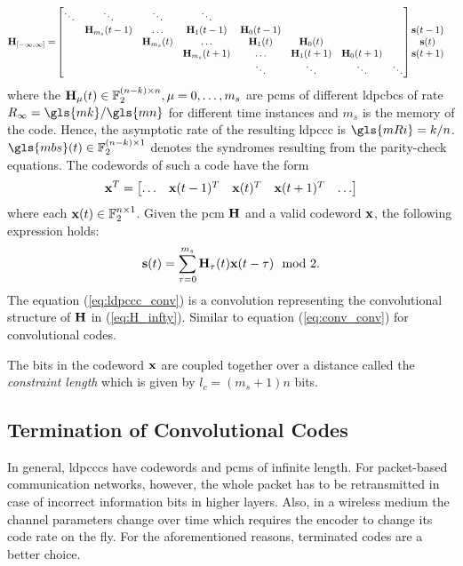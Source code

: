 \begin{align}\label{eq:H_infty}
\mathbf{H}_{[-\infty,\infty]} =& 
\begin{bmatrix}
  \ddots &\ddots &\ddots &\ddots\\
  &\mathbf{H}_{m_s}(t-1) &\dots &\mathbf{H}_1(t-1) &\mathbf{H}_0(t-1)\\
  & &\mathbf{H}_{m_s}(t) &\dots &\mathbf{H}_1(t) &\mathbf{H}_0(t)\\
  & & &\mathbf{H}_{m_s}(t+1) &\dots &\mathbf{H}_1(t+1) &\mathbf{H}_0(t+1)\\
  & & & &\ddots &\ddots &\ddots &\ddots
  \end{bmatrix}
  \begin{matrix}
  \mathbf{s}(t-1)\\
  \mathbf{s}(t)\\
  \mathbf{s}(t+1)\\
  \end{matrix}
\end{align}
where the $\mathbf{H}_\mu(t)\in\mathbb{F}_2^{(n-k)\times n},\mu=0,\dots,m_s$ are \glspl{pcm} of different \glspl{ldpcbc} of rate $R_\infty=\gls{mk}/\gls{mn}$ for different time instances and $m_s$ is the memory of the code. Hence, the asymptotic rate of the resulting \gls{ldpccc} is $\gls{mRi}=k/n$. $\gls{mbs}(t)\in\mathbb{F}_2^{(n-k)\times 1}$ denotes the syndromes resulting from the parity-check equations. The codewords of such a code have the form 
\begin{align}
\mathbf{x}^T=
\begin{bmatrix}
\dots &\mathbf{x}(t-1)^T &\mathbf{x}(t)^T &\mathbf{x}(t+1)^T &\dots
\end{bmatrix}
\end{align}
where each $\mathbf{x}(t)\in\mathbb{F}_2^{n\times 1}$. Given the \gls{pcm} $\mathbf{H}$ and a valid codeword $\mathbf{x}$, the following expression holds:
\begin{align}\label{eq:ldpccc_conv}
\mathbf{s}(t)=\sum_{\tau=0}^{m_s}\mathbf{H}_\tau(t)\mathbf{x}(t-\tau)\mod 2.
\end{align}
The equation (\ref{eq:ldpccc_conv}) is a convolution representing the convolutional structure of $\mathbf{H}$ in (\ref{eq:H_infty}). Similar to equation (\ref{eq:conv_conv}) for convolutional codes.

The bits in the codeword $\mathbf{x}$ are coupled together over a distance called the \emph{constraint length} which is given by $l_c=(m_s+1)n$ bits.

\subsection{Termination of Convolutional Codes}
In general, \glspl{ldpccc} have codewords and \glspl{pcm} of infinite length. For packet-based communication networks, however, the whole packet has to be retransmitted in case of incorrect information bits in higher layers. Also, in a wireless medium the channel parameters change over time which requires the encoder to change its code rate on the fly. For the aforementioned reasons, terminated codes are a better choice.

